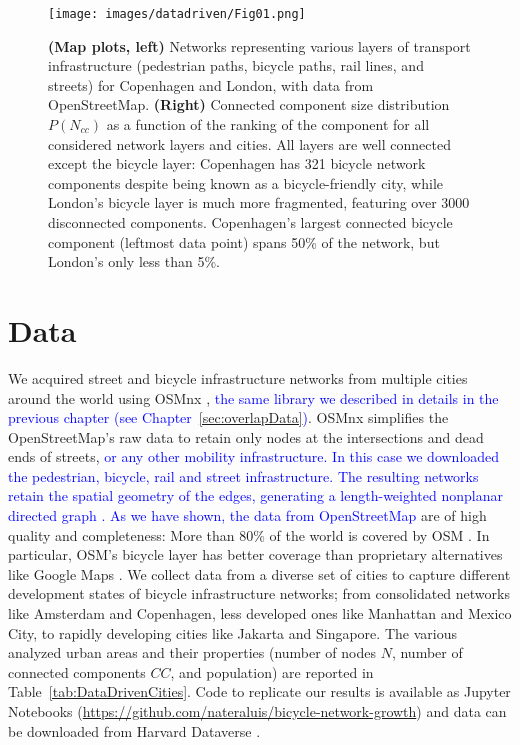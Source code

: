 \begin{figure}[th!]
  \centering
  \texttt{[image: images/datadriven/Fig01.png]}
  \caption[Multimodal configuration]{\textbf{(Map plots, left)} Networks representing various layers of transport infrastructure (pedestrian paths, bicycle paths, rail lines, and streets) for Copenhagen and London, with data from OpenStreetMap. \textbf{(Right)} Connected component size distribution $P(N_{cc})$ as a function of the ranking of the component for all considered network layers and cities. All layers are well connected except the bicycle layer: Copenhagen has 321 bicycle network components despite being known as a bicycle-friendly city, while London's bicycle layer is much more fragmented, featuring over 3000 disconnected components. Copenhagen's largest connected bicycle component (leftmost data point) spans 50\% of the network, but London's only less than 5\%.}
  \label{fig:Multimodal}
\end{figure}

\section{Data}
We acquired street and bicycle infrastructure networks from multiple cities around the world using OSMnx \cite{boeing2017osmnx}, \textcolor{blue}{the same library we described in details in the previous chapter (see Chapter~\ref{sec:overlapData})}. OSMnx simplifies the OpenStreetMap's raw data to retain only nodes at the intersections and dead ends of streets, \textcolor{blue}{or any other mobility infrastructure. In this case we downloaded the pedestrian, bicycle, rail and street infrastructure. The resulting networks retain the spatial geometry of the edges, generating a length-weighted nonplanar directed graph \cite{Boeing2020Planarity}. As we have shown, the data from OpenStreetMap} are of high quality \cite{haklay2010openstreetmap,girres2010quality,Ferster2019Bicycle} and completeness: More than $80\%$ of the world is covered by OSM \cite{barbosa2018human}. In particular, OSM's bicycle layer has better coverage than proprietary alternatives like Google Maps \cite{Hochmair2012}. We collect data from a diverse set of cities to capture different development states of bicycle infrastructure networks; from consolidated networks like Amsterdam and Copenhagen, less developed ones like Manhattan and Mexico City, to rapidly developing cities like Jakarta and Singapore. The various analyzed urban areas and their properties (number of nodes $N$, number of connected components $CC$, and population) are reported in Table~\ref{tab:DataDrivenCities}. Code to replicate our results is available as Jupyter Notebooks (\url{https://github.com/nateraluis/bicycle-network-growth}) and data can be downloaded from Harvard Dataverse \cite{natera2019data}.

